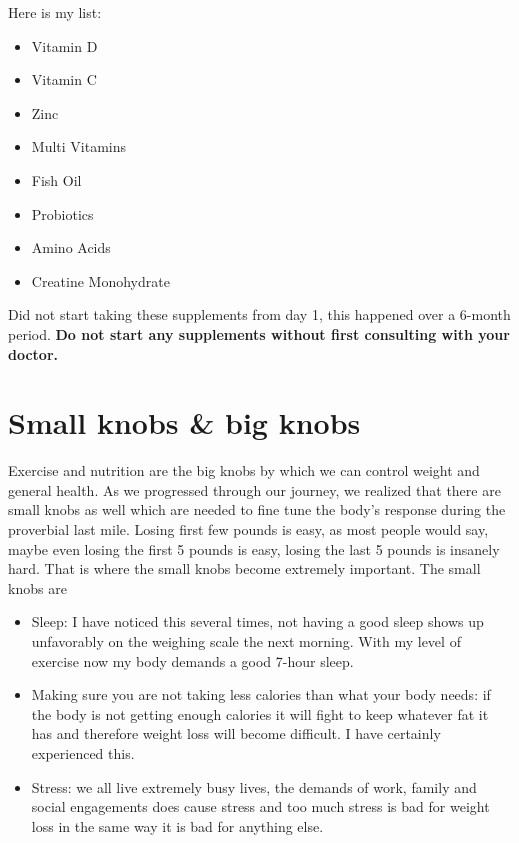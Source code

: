 \documentclass[
  oneside]{book}
\providecommand{\tightlist}{%
  \setlength{\itemsep}{0pt}\setlength{\parskip}{0pt}}
\begin{document}
Here is my list:

\begin{itemize}
\tightlist
\item
  Vitamin D
\item
  Vitamin C
\item
  Zinc
\item
  Multi Vitamins
\item
  Fish Oil
\item
  Probiotics
\item
  Amino Acids
\item
  Creatine Monohydrate
\end{itemize}

Did not start taking these supplements from day 1, this happened over a 6-month period. \textbf{Do not start any supplements without first consulting with your doctor.}

\hypertarget{small-knobs-big-knobs}{%
\section{Small knobs \& big knobs}\label{small-knobs-big-knobs}}

Exercise and nutrition are the big knobs by which we can control weight and general health. As we progressed through our journey, we realized that there are small knobs as well which are needed to fine tune the body's response during the proverbial last mile. Losing first few pounds is easy, as most people would say, maybe even losing the first 5 pounds is easy, losing the last 5 pounds is insanely hard. That is where the small knobs become extremely important. The small knobs are

\begin{itemize}
\item
  Sleep: I have noticed this several times, not having a good sleep shows up unfavorably on the weighing scale the next morning. With my level of exercise now my body demands a good 7-hour sleep.
\item
  Making sure you are not taking less calories than what your body needs: if the body is not getting enough calories it will fight to keep whatever fat it has and therefore weight loss will become difficult. I have certainly experienced this.
\item
  Stress: we all live extremely busy lives, the demands of work, family and social engagements does cause stress and too much stress is bad for weight loss in the same way it is bad for anything else.
\end{itemize}
\end{document}
